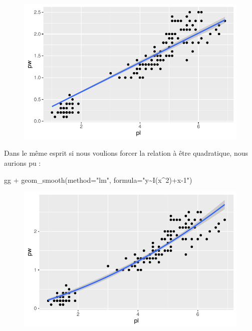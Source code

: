 \documentclass[
  letterpaper,
  DIV=11,
  numbers=noendperiod]{scrreprt}
\newenvironment{Shaded}{\begin{snugshade}}{\end{snugshade}}
\newcommand{\AttributeTok}[1]{\textcolor[rgb]{0.40,0.45,0.13}{#1}}
\newcommand{\FunctionTok}[1]{\textcolor[rgb]{0.28,0.35,0.67}{#1}}
\newcommand{\NormalTok}[1]{\textcolor[rgb]{0.00,0.23,0.31}{#1}}
\newcommand{\SpecialCharTok}[1]{\textcolor[rgb]{0.37,0.37,0.37}{#1}}
\newcommand{\StringTok}[1]{\textcolor[rgb]{0.13,0.47,0.30}{#1}}
\begin{document}
\begin{figure}[H]

{\centering \includegraphics{ggplot2_files/figure-pdf/unnamed-chunk-9-1.pdf}

}

\end{figure}

Dans le même esprit si nous voulions forcer la relation à être
quadratique, nous aurions pu :

\begin{Shaded}
\begin{Highlighting}[]
\NormalTok{gg }\SpecialCharTok{+} \FunctionTok{geom\_smooth}\NormalTok{(}\AttributeTok{method=}\StringTok{"lm"}\NormalTok{, }\AttributeTok{formula=}\StringTok{"y\textasciitilde{}I(x\^{}2)+x{-}1"}\NormalTok{)}
\end{Highlighting}
\end{Shaded}

\begin{figure}[H]

{\centering \includegraphics{ggplot2_files/figure-pdf/unnamed-chunk-10-1.pdf}

}

\end{figure}
\end{document}
